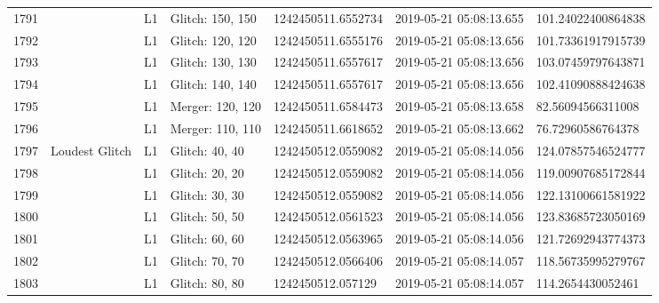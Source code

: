 \begin{longtable}{lllllll}
1791 &                                                    &       L1 &  Glitch: 150, 150 &  1242450511.6552734 &  2019-05-21 05:08:13.655 &  101.24022400864838 \\
1792 &                                                    &       L1 &  Glitch: 120, 120 &  1242450511.6555176 &  2019-05-21 05:08:13.656 &  101.73361917915739 \\
1793 &                                                    &       L1 &  Glitch: 130, 130 &  1242450511.6557617 &  2019-05-21 05:08:13.656 &  103.07459797643871 \\
1794 &                                                    &       L1 &  Glitch: 140, 140 &  1242450511.6557617 &  2019-05-21 05:08:13.656 &  102.41090888424638 \\
1795 &                                                    &       L1 &  Merger: 120, 120 &  1242450511.6584473 &  2019-05-21 05:08:13.658 &   82.56094566311008 \\
1796 &                                                    &       L1 &  Merger: 110, 110 &  1242450511.6618652 &  2019-05-21 05:08:13.662 &   76.72960586764378 \\
1797 &                                     Loudest Glitch &       L1 &    Glitch: 40, 40 &  1242450512.0559082 &  2019-05-21 05:08:14.056 &  124.07857546524777 \\
1798 &                                                    &       L1 &    Glitch: 20, 20 &  1242450512.0559082 &  2019-05-21 05:08:14.056 &  119.00907685172844 \\
1799 &                                                    &       L1 &    Glitch: 30, 30 &  1242450512.0559082 &  2019-05-21 05:08:14.056 &  122.13100661581922 \\
1800 &                                                    &       L1 &    Glitch: 50, 50 &  1242450512.0561523 &  2019-05-21 05:08:14.056 &  123.83685723050169 \\
1801 &                                                    &       L1 &    Glitch: 60, 60 &  1242450512.0563965 &  2019-05-21 05:08:14.056 &  121.72692943774373 \\
1802 &                                                    &       L1 &    Glitch: 70, 70 &  1242450512.0566406 &  2019-05-21 05:08:14.057 &  118.56735995279767 \\
1803 &                                                    &       L1 &    Glitch: 80, 80 &   1242450512.057129 &  2019-05-21 05:08:14.057 &   114.2654430052461 \\

\end{longtable}
